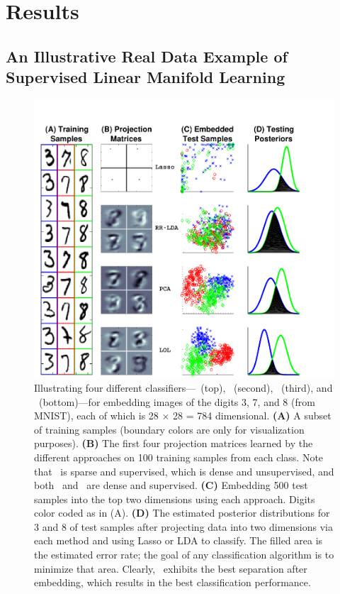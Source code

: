 \documentclass[10pt]{article}
\begin{document}
\section*{Results}

\subsection*{An Illustrative Real Data Example of Supervised Linear Manifold Learning}



\begin{figure}
\centering %
\includegraphics[width=0.7\linewidth,trim=1cm 0cm 0cm 1.0cm,clip=true]{../Figs/mnist}
\caption{
Illustrating four different classifiers---~(top), \Lda~(second),  \Pca~(third), and \Lol~(bottom)---for embedding images of the digits 3, 7, and 8 (from MNIST), each of which is 28 $\times$ 28 = 784 dimensional.
\textbf{(A)} A subset of training samples  (boundary colors are only for visualization purposes).
\textbf{(B)} The first four projection matrices learned by the  different approaches on 100 training samples from each class.
Note that ~is sparse and supervised, \Pca which is dense and unsupervised, and both \Lda~and \Lol~are dense and supervised.
\textbf{(C)} Embedding 500 test samples into the top two dimensions using each approach.  Digits color coded as in (A).
\textbf{(D)}  The estimated posterior distributions for 3 and 8 of test samples after
projecting data into two dimensions via each method and using Lasso or LDA to classify.
The filled area is the estimated error rate; the goal of any classification algorithm is to minimize that area.
Clearly, \Lol~exhibits the best separation after embedding, which results in the best classification performance.
}
\label{f:mnist}
\end{figure}
\end{document}

